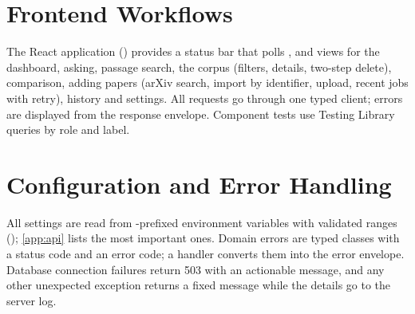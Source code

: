 \section{Frontend Workflows}

The React application () provides a status bar that polls , and
views for the dashboard, asking, passage search, the corpus (filters, details, two-step delete), comparison, adding
papers (arXiv search, import by identifier, upload, recent jobs with retry), history and settings. All requests go
through one typed client; errors are displayed from the response envelope. Component tests use Testing Library
queries by role and label.

\section{Configuration and Error Handling}

All settings are read from -prefixed environment variables with validated ranges
(); \autoref{app:api} lists the most important ones. Domain errors are typed classes
with a status code and an error code; a handler converts them into the error envelope. Database connection
failures return 503 with an actionable message, and any other unexpected exception returns a fixed message while
the details go to the server log.

